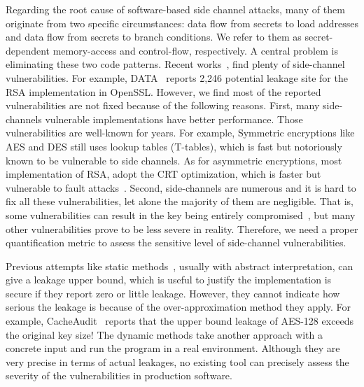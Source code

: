 Regarding the root cause of software-based side channel attacks, many of them originate
from two specific circumstances: data flow from secrets to load
addresses and data flow from secrets to branch conditions. We refer to them as
 secret-dependent memory-access and control-flow, respectively. A
central problem is eliminating these two code patterns. 
Recent
works~\cite{203878,217537,Wichelmann:2018:MFF:3274694.3274741,Brotzman19Casym,236338,182946},
find plenty of side-channel vulnerabilities. For example,
DATA~\cite{217537} reports 2,246 potential leakage site for the RSA
implementation in OpenSSL\@. 
However, we find most of the reported vulnerabilities are not fixed because
of the following reasons.
First, many side-channels vulnerable implementations have better performance.
Those vulnerabilities are well-known for years. For example,
Symmetric encryptions like AES and DES still uses lookup tables (T-tables), which
is fast but notoriously known to be vulnerable to side channels.
As for asymmetric encryptions, most implementation of RSA, adopt the CRT optimization,
which is faster but vulnerable to fault attacks~\cite{aumuller2002fault}.
Second, side-channels are numerous and it is hard to fix all these vulnerabilities, 
let alone the majority of them are negligible. 
That is, some vulnerabilities can result in the key being 
entirely compromised~\cite{184415, aumuller2002fault}, but many other vulnerabilities prove to be less
severe in reality. Therefore, we need a proper quantification metric to 
assess the sensitive level of side-channel vulnerabilities.

Previous attempts like static methods~\cite{182946,5207642}, usually with
abstract interpretation, can give a leakage upper bound, which is useful to
justify the implementation is secure if they report zero or little leakage.
However, they cannot indicate how serious the leakage is because of the
over-approximation method they apply. For example, CacheAudit~\cite{182946} reports that the upper
bound leakage of AES-128 exceeds the original key size! The dynamic methods take
another approach with a concrete input and run the program in a real
environment. Although they are very precise in terms of actual leakages, no
existing tool can precisely assess the severity of the vulnerabilities in production
software. 

